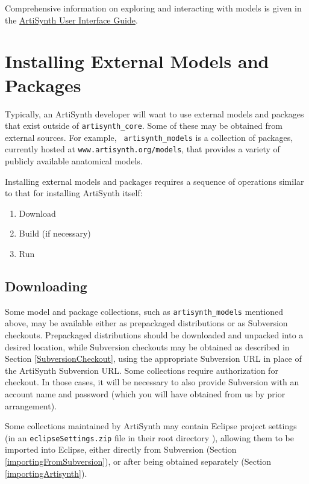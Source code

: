 \documentclass{article}
\def\directory{directory }
\begin{document}
Comprehensive information on exploring and interacting with models is
given in the
\href{http://www.artisynth.org/doc/html/uiguide/uiguide.html}
{ArtiSynth User Interface Guide}.

\section{Installing External Models and Packages}
\label{AdditionalModelsAndPackages}

Typically, an ArtiSynth developer will want to use external models and
packages that exist outside of {\tt artisynth\_core}.  Some of these
may be obtained from external sources.  For example, {\tt
artisynth\_models} is a collection of packages, currently hosted at
{\tt www.artisynth.org/models}, that provides a variety of publicly
available anatomical models.

Installing external models and packages requires a sequence of
operations similar to that for installing ArtiSynth itself:

\begin{enumerate}

\item Download

\item Build (if necessary)

\item Run

\end{enumerate}

\subsection{Downloading}

Some model and package collections, such as {\tt artisynth\_models}
mentioned above, may be available either as prepackaged distributions
or as Subversion checkouts. Prepackaged distributions should be
downloaded and unpacked into a desired location, while Subversion
checkouts may be obtained as described in Section
\ref{SubversionCheckout}, using the appropriate Subversion URL in
place of the ArtiSynth Subversion URL. Some collections require
authorization for checkout. In those cases, it will be necessary to
also provide Subversion with an account name and password (which you
will have obtained from us by prior arrangement).

Some collections maintained by ArtiSynth may contain Eclipse project
settings (in an {\tt eclipseSettings.zip} file in their root
\directory), allowing them to be imported into Eclipse, either
directly from Subversion (Section \ref{importingFromSubversion}), or
after being obtained separately (Section \ref{importingArtisynth}).
\end{document}
